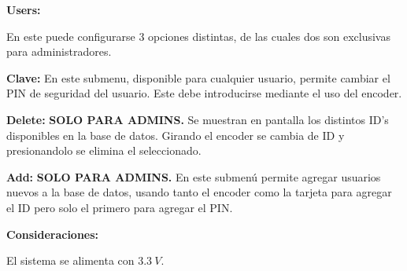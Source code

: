 \vspace*{0.25cm}
\textbf{\Large{Users:}}

En este puede configurarse 3 opciones distintas, de las cuales dos son exclusivas para administradores.

\vspace*{0.25cm}
\textbf{\large{Clave:}}
En este submenu, disponible para cualquier usuario, permite cambiar el PIN de seguridad del usuario. Este debe introducirse mediante el uso del encoder.

\vspace*{0.25cm}
\textbf{\large{Delete:}}
\textbf{SOLO PARA ADMINS.} Se muestran en pantalla los distintos ID's disponibles en la base de datos. Girando el encoder se cambia de ID y presionandolo se elimina el seleccionado.

\vspace*{0.25cm}
\textbf{\large{Add:}}
\textbf{SOLO PARA ADMINS.} En este submenú permite agregar usuarios nuevos a la base de datos, usando tanto el encoder como la tarjeta para agregar el ID pero solo el primero para agregar el PIN.

\vspace*{0.5cm}
\begin{center}
\textbf{\LARGE{Consideraciones:}}
\end{center}

El sistema se alimenta con $3.3 \ V$.